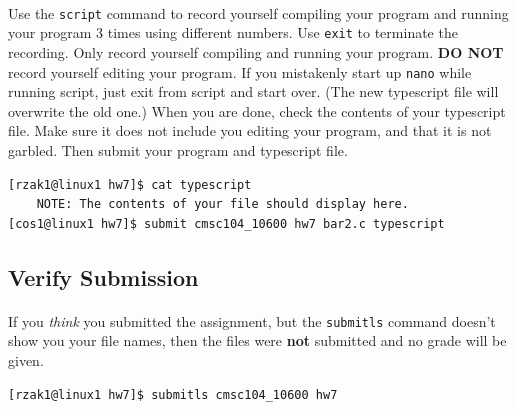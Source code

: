 \documentclass[letter,11pt]{article}
\begin{document}
\paragraph{}Use the \texttt{script} command to record yourself compiling your program and running your program 3 times using different numbers. Use \texttt{exit} to terminate the recording. Only record yourself compiling and running your program. \textbf{DO NOT} record yourself editing your program. If you mistakenly start up \texttt{nano} while running script, just exit from script and start over. (The new typescript file will overwrite the old one.) When you are done, check the contents of your typescript file. Make sure it does not include you editing your program, and that it is not garbled. Then submit your program and typescript file.
\begin{verbatim}
[rzak1@linux1 hw7]$ cat typescript
    NOTE: The contents of your file should display here.
[cos1@linux1 hw7]$ submit cmsc104_10600 hw7 bar2.c typescript
\end{verbatim}

\subsection*{Verify Submission}
\paragraph{}If you \textit{think} you submitted the assignment, but the \texttt{submitls} command doesn't show you your file names, then the files were \textbf{not} submitted and no grade will be given.
\begin{verbatim}
[rzak1@linux1 hw7]$ submitls cmsc104_10600 hw7
\end{verbatim}
\end{document}

